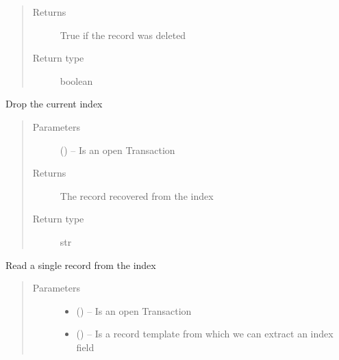 \documentclass[letterpaper,10pt,english]{sphinxmanual}
\begin{document}
\begin{fulllineitems}
\begin{fulllineitems}
\begin{quote}
\begin{description}
\begin{itemize}
\end{itemize}

\item[{Returns}] \leavevmode
True if the record was deleted

\item[{Return type}] \leavevmode
boolean

\end{description}\end{quote}

\end{fulllineitems}


\begin{fulllineitems}
\label{\detokenize{index:mamba.Index.drop}}
Drop the current index
\begin{quote}\begin{description}
\item[{Parameters}] \leavevmode
{} () -- Is an open Transaction

\item[{Returns}] \leavevmode
The record recovered from the index

\item[{Return type}] \leavevmode
str

\end{description}\end{quote}

\end{fulllineitems}


\begin{fulllineitems}
\label{\detokenize{index:mamba.Index.get}}
Read a single record from the index
\begin{quote}\begin{description}
\item[{Parameters}] \leavevmode\begin{itemize}
\item {} 
 () -- Is an open Transaction

\item {} 
 () -- Is a record template from which we can extract an index field


\end{itemize}
\end{description}
\end{quote}
\end{fulllineitems}
\end{fulllineitems}
\end{document}
